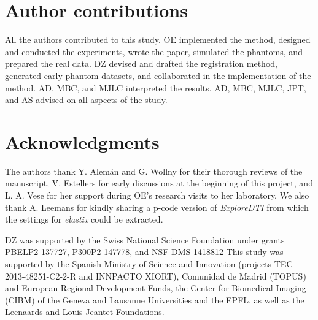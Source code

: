 \section*{Author contributions}
All the authors contributed to this study.
OE implemented the method, designed and conducted the experiments, wrote the paper,
  simulated the phantoms, and prepared the real data.
DZ devised and drafted the registration method, generated early phantom datasets, and
  collaborated in the implementation of the method.
AD, MBC, and MJLC interpreted the results.
AD, MBC, MJLC, JPT, and AS advised on all aspects of the study.

\section*{Acknowledgments}
The authors thank Y. Alem\'an and G. Wollny for their thorough reviews of the manuscript,
  V. Estellers for early discussions at the beginning of this project,
  and L. A. Vese for her support during OE's research visits to her laboratory.
We also thank A. Leemans for kindly sharing a p-code version of \emph{ExploreDTI} from
  which the settings for \emph{elastix} could be extracted.

DZ was supported by the Swiss National Science Foundation under grants PBELP2-137727, 
  P300P2-147778, and NSF-DMS 1418812
This study was supported by the Spanish Ministry of Science and Innovation
  (projects TEC-2013-48251-C2-2-R and INNPACTO XIORT), Comunidad de Madrid (TOPUS) and
  European Regional Development Funds, the Center for Biomedical Imaging
  (CIBM) of the Geneva and Lausanne Universities and the EPFL, as well as the
  Leenaards and Louis Jeantet Foundations.